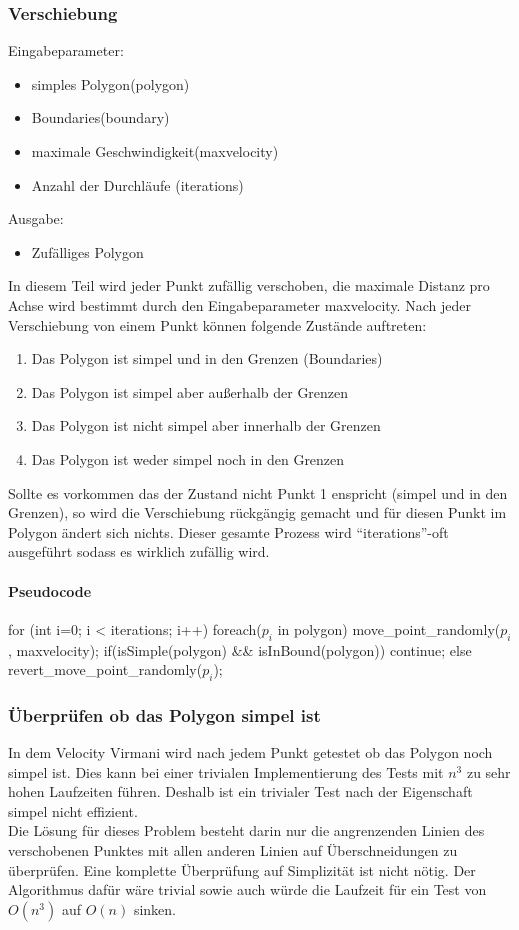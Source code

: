 \subsubsection{Verschiebung}
Eingabeparameter: 
\begin{itemize}
	\item simples Polygon(polygon)
	\item Boundaries(boundary)
	\item maximale Geschwindigkeit(maxvelocity)
	\item Anzahl der Durchläufe (iterations)
\end{itemize}
Ausgabe:
\begin{itemize}
	\item Zufälliges Polygon
\end{itemize}
In diesem Teil wird jeder Punkt zufällig verschoben, die maximale Distanz pro Achse wird bestimmt durch den Eingabeparameter maxvelocity. Nach jeder Verschiebung von einem Punkt können folgende Zustände auftreten:
\begin{enumerate}
	\item Das Polygon ist simpel und in den Grenzen (Boundaries)
	\item Das Polygon ist simpel aber außerhalb der Grenzen
	\item Das Polygon ist nicht simpel aber innerhalb der Grenzen
	\item Das Polygon ist weder simpel noch in den Grenzen
\end{enumerate}
Sollte es vorkommen das der Zustand nicht Punkt 1 enspricht (simpel und in den Grenzen), so wird die Verschiebung rückgängig gemacht und für diesen Punkt im Polygon ändert sich nichts.
Dieser gesamte Prozess wird \enquote{iterations}-oft ausgeführt sodass es wirklich zufällig wird.

\paragraph{Pseudocode}

\begin{code}[mathescape=true]
for (int i=0; i < iterations; i++)
{
	foreach($p_i$ in polygon)
	{
		move_point_randomly($p_i$, maxvelocity);
		if(isSimple(polygon) && isInBound(polygon))
			continue;
		else
			revert_move_point_randomly($p_i$);
	}
}
\end{code}

\subsubsection{Überprüfen ob das Polygon simpel ist}
In dem Velocity Virmani wird nach jedem Punkt getestet ob das Polygon noch simpel ist. Dies kann bei einer trivialen Implementierung des Tests mit $n^3$ zu sehr hohen Laufzeiten führen.
Deshalb ist ein trivialer Test nach der Eigenschaft simpel nicht effizient.\smallskip \\ 
Die Lösung für dieses Problem besteht darin nur die angrenzenden Linien des verschobenen Punktes mit allen anderen Linien auf Überschneidungen zu überprüfen. Eine komplette Überprüfung auf Simplizität ist nicht nötig.
Der Algorithmus dafür wäre trivial sowie auch würde die Laufzeit für ein Test von $O(n^3)$ auf $O(n)$ sinken.

